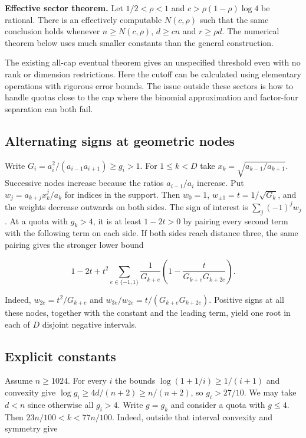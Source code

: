 \documentclass[11pt]{article}
\begin{document}
\textbf{Effective sector theorem.} Let $1/2<\rho<1$ and $c>\rho(1-\rho)\log4$ be rational. There is an effectively computable $N(c,\rho)$ such that the same conclusion holds whenever $n\ge N(c,\rho)$, $d\ge cn$ and $r\ge\rho d$. The numerical theorem below uses much smaller constants than the general construction.

The existing all-cap eventual theorem gives an unspecified threshold even with no rank or dimension restrictions. Here the cutoff can be calculated using elementary operations with rigorous error bounds. The issue outside these sectors is how to handle quotas close to the cap where the binomial approximation and factor-four separation can both fail.

\subsection{Alternating signs at geometric nodes}

Write $G_i=a_i^2/(a_{i-1}a_{i+1})\ge g_i>1$. For $1\le k<D$ take $x_k=\sqrt{a_{k-1}/a_{k+1}}$. Successive nodes increase because the ratios $a_{i-1}/a_i$ increase. Put $w_j=a_{k+j}x_k^j/a_k$ for indices in the support. Then $w_0=1$, $w_{\pm1}=t=1/\sqrt{G_k}$, and the weights decrease outwards on both sides. The sign of interest is $\sum_j(-1)^j w_j$. At a quota with $g_k>4$, it is at least $1-2t>0$ by pairing every second term with the following term on each side. If both sides reach distance three, the same pairing gives the stronger lower bound

\begin{equation*}
1-2t+t^2\sum_{e\in\lbrace-1,1\rbrace}\frac1{G_{k+e}}\left(1-\frac{t}{G_{k+e}G_{k+2e}}\right).
\end{equation*}

Indeed, $w_{2e}=t^2/G_{k+e}$ and $w_{3e}/w_{2e}=t/(G_{k+e}G_{k+2e})$. Positive signs at all these nodes, together with the constant and the leading term, yield one root in each of $D$ disjoint negative intervals.

\subsection{Explicit constants}

Assume $n\ge1024$. For every $i$ the bounds $\log(1+1/i)\ge1/(i+1)$ and convexity give $\log g_i\ge4d/(n+2)\ge n/(n+2)$, so $g_i>27/10$. We may take $d<n$ since otherwise all $g_i>4$. Write $g=g_k$ and consider a quota with $g\le4$. Then $23n/100<k<77n/100$. Indeed, outside that interval convexity and symmetry give
\end{document}
